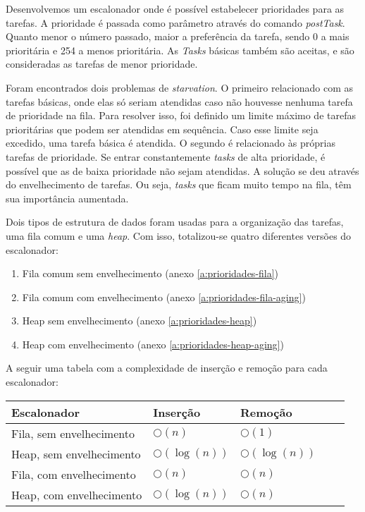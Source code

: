 Desenvolvemos um escalonador onde é possível estabelecer prioridades para as tarefas. 
A prioridade é passada como parâmetro através 
do comando \textit{postTask}. Quanto menor o número passado, maior a preferência da tarefa, sendo 0 a
mais prioritária e 254 a menos prioritária.
As \textit{Tasks} básicas também são aceitas, e são consideradas as tarefas de menor prioridade.

Foram encontrados dois problemas de \textit{starvation}. O primeiro relacionado com as tarefas básicas,
onde elas só seriam atendidas caso não houvesse nenhuma tarefa de prioridade na fila. Para resolver isso, foi definido um
limite máximo de tarefas prioritárias que podem ser atendidas em sequência. Caso esse limite seja excedido, uma tarefa
básica é atendida. O segundo é relacionado às próprias tarefas de prioridade. 
Se entrar constantemente \textit{tasks} de alta
prioridade, é possível que as de baixa prioridade não sejam atendidas. A solução se deu através do envelhecimento de
tarefas. Ou seja, \textit{tasks} que ficam muito tempo na fila, têm sua importância aumentada.

Dois tipos de estrutura de dados foram usadas para a organização das tarefas, uma fila comum e uma \textit{heap}. Com
isso, totalizou-se quatro diferentes versões do escalonador:
\begin{enumerate}
    \item Fila comum sem envelhecimento (anexo \ref{a:prioridades-fila})
    \item Fila comum com envelhecimento (anexo \ref{a:prioridades-fila-aging})
    \item Heap sem envelhecimento (anexo \ref{a:prioridades-heap})
    \item Heap com envelhecimento (anexo \ref{a:prioridades-heap-aging})
\end{enumerate}
A seguir uma tabela com a complexidade de inserção e remoção para cada escalonador:
\begin{center}
    \begin{tabular}{ | l | l | l | l | p{5cm} |}
    \hline
    Escalonador & Inserção & Remoção \\ \hline
    Fila, sem envelhecimento & $\bigcirc(n)$ & $\bigcirc(1)$ \\ \hline 
    Heap, sem envelhecimento & $\bigcirc(\log(n))$ & $\bigcirc(\log(n))$ \\ \hline
    Fila, com envelhecimento & $\bigcirc(n)$ & $\bigcirc(n)$ \\ \hline
    Heap, com envelhecimento & $\bigcirc(\log(n))$ & $\bigcirc(n)$ \\ \hline
    \end{tabular}
\end{center}
